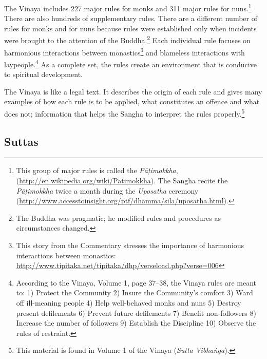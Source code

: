 The Vinaya includes 227 major rules for monks and 311 major rules for nuns.\footnote{This group of major rules is called the \textit{Pāṭimokkha}, (\url{http://en.wikipedia.org/wiki/Patimokkha}). The Sangha recite the \textit{Pāṭimokkha} twice a month during the \textit{Uposatha} ceremony (\url{http://www.accesstoinsight.org/ptf/dhamma/sila/uposatha.html}).} There are also hundreds of supplementary rules. There are a different number of rules for monks and for nuns because rules were established only when incidents were brought to the attention of the Buddha.\footnote{The Buddha was pragmatic; he modified rules and procedures as circumstances changed.} Each individual rule focuses on harmonious interactions between monastics\footnote{This story from the Commentary stresses the importance of harmonious interactions between monastics: \url{http://www.tipitaka.net/tipitaka/dhp/verseload.php?verse=006}} and blameless interactions with laypeople.\footnote{According to the Vinaya, Volume 1, page 37--38, the Vinaya rules are meant to: 1) Protect the Community 2) Insure the Community’s comfort 3) Ward off ill-meaning people 4) Help well-behaved monks and nuns 5) Destroy present defilements 6) Prevent future defilements 7) Benefit non-followers 8) Increase the number of followers 9) Establish the Discipline 10) Observe the rules of restraint.} As a complete set, the rules create an environment that is conducive to spiritual development.

The Vinaya is like a legal text. It describes the origin of each rule and gives many examples of how each rule is to be applied, what constitutes an offence and what does not; information that helps the Sangha to interpret the rules properly.\footnote{This material is found in Volume 1 of the Vinaya (\textit{Sutta Vibhaṅga}).}

\subsection*{Suttas}

